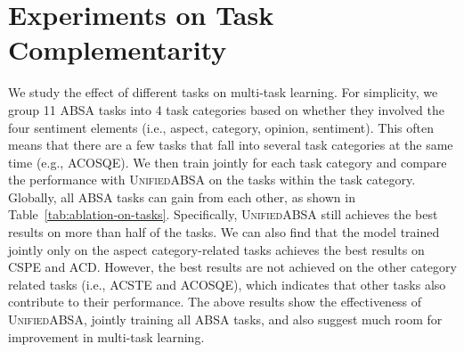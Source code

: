 \documentclass[11pt]{article}
\newcommand{\UnifiedABSA}{\textsc{UnifiedABSA}\xspace}
\begin{document}
\section{Experiments on Task Complementarity}
\label{sec-appendix:effect-of-training-tasks}
We study the effect of different tasks on multi-task learning. For simplicity, we group 11 ABSA tasks into  4 task categories based on whether they involved the four sentiment elements (i.e., aspect, category, opinion, sentiment). This often means that there are a few tasks that fall into several task categories at the same time (e.g., ACOSQE). We then train jointly for each task category and compare the performance with \UnifiedABSA on the tasks within the task category. Globally, all ABSA tasks can gain from each other, as shown in Table~\ref{tab:ablation-on-tasks}. Specifically, \UnifiedABSA still achieves the best results on more than half of the tasks. We can also find that the model trained jointly only on the aspect category-related tasks achieves the best results on CSPE and ACD. However, the best results are not achieved on the other category related tasks (i.e., ACSTE and ACOSQE), which indicates that other tasks also contribute to their performance. The above results show the effectiveness of \UnifiedABSA, jointly training all ABSA tasks, and also suggest much room for improvement in multi-task learning.
\end{document}
